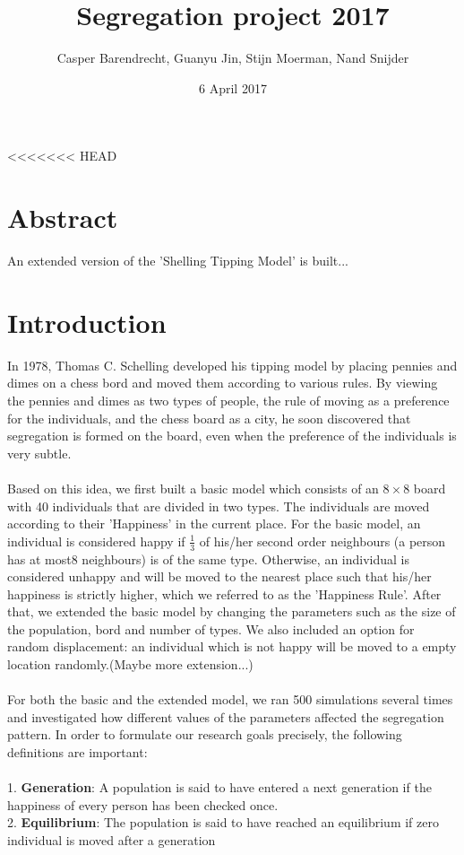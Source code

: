 \documentclass{article}
\title{Segregation project 2017}
\author{Casper Barendrecht, Guanyu Jin, Stijn Moerman, Nand Snijder}
\date{6 April 2017}
\begin{document}
\reversemarginpar 
\maketitle
<<<<<<< HEAD
\section{Abstract}
An extended version of the 'Shelling Tipping Model' is built...
\section{Introduction}
In 1978, Thomas C. Schelling developed his tipping model by placing pennies and dimes on a chess bord and moved them according to various rules. By viewing the pennies and dimes as two types of people, the rule of moving as a preference for the individuals, and the chess board as a city, he soon discovered that segregation is formed on the board, even when the preference of the individuals is very subtle.\\
\\
Based on this idea, we first built a basic model which consists of an \(8\times8\) board with 40 individuals that are divided in two types. The individuals are moved according to their 'Happiness' in the current place. For the basic model, an individual is considered happy if $\frac{1}{3}$ of his/her second order neighbours (a person has at most8 neighbours) is of the same type. Otherwise, an individual is considered unhappy and will be moved to the nearest place such that his/her happiness is strictly higher, which we referred to as the 'Happiness Rule'. After that, we extended the basic model by changing the parameters such as the size of the population, bord and number of types. We also included an option for random displacement: an individual which is not happy will be moved to a empty location randomly.(Maybe more extension...)\\\\
For both the basic and the extended model, we ran 500 simulations several times and investigated how different values of the parameters affected the segregation pattern. In order to formulate our research goals precisely, the following definitions are important:\\
\\
1. \textbf{Generation}: A population is said to have entered a next generation if the happiness of every person has been checked once. \\
2. \textbf{Equilibrium}: The population is said to have reached an equilibrium if zero individual is moved after a generation\\
\end{document}

